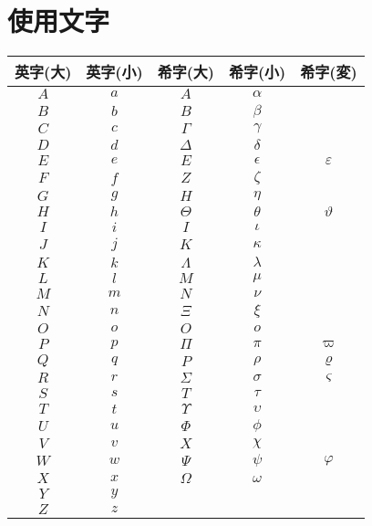 \section{使用文字}
	\begin{table}[htb]
		\begin{tabular}{|c|c|c|c|c|} \hline
			英字(大) & 英字(小) & 希字(大) & 希字(小) & 希字(変) \\ \hline \hline
			$A$ & $a$ & $A$ & $\alpha$ & \\ \hline
			$B$ & $b$ & $B$ & $\beta$ & \\ \hline
			$C$ & $c$ & $\Gamma$ & $\gamma$ & \\ \hline
			$D$ & $d$ & $\Delta$ & $\delta$ & \\ \hline
			$E$ & $e$ & $E$ & $\epsilon$ & $\varepsilon$ \\ \hline
			$F$ & $f$ & $Z$ & $\zeta$ & \\ \hline
			$G$ & $g$ & $H$ & $\eta$ & \\ \hline
			$H$ & $h$ & $\Theta$ & $\theta$ & $\vartheta$ \\ \hline
			$I$ & $i$ & $I$ & $\iota$ & \\ \hline
			$J$ & $j$ & $K$ & $\kappa$ & \\ \hline
			$K$ & $k$ & $\Lambda$ & $\lambda$ & \\ \hline
			$L$ & $l$ & $M$ & $\mu$ & \\ \hline
			$M$ & $m$ & $N$ & $\nu$ & \\ \hline
			$N$ & $n$ & $\Xi$ & $\xi$ & \\ \hline
			$O$ & $o$ & $O$ & $o$ & \\ \hline
			$P$ & $p$ & $\Pi$ & $\pi$ & $\varpi$ \\ \hline
			$Q$ & $q$ & $P$ & $\rho$ & $\varrho$ \\ \hline
			$R$ & $r$ & $\Sigma$ & $\sigma$ & $\varsigma$ \\ \hline
			$S$ & $s$ & $T$ & $\tau$ & \\ \hline
			$T$ & $t$ & $\Upsilon$ & $\upsilon$ & \\ \hline
			$U$ & $u$ & $\Phi$ & $\phi$ & \\ \hline
			$V$ & $v$ & $X$ & $\chi$ & \\ \hline
			$W$ & $w$ & $\Psi$ & $\psi$ & $\varphi$ \\ \hline
			$X$ & $x$ & $\Omega$ & $\omega$ & \\ \hline
			$Y$ & $y$ & & & \\ \hline
			$Z$ & $z$ & & & \\ \hline
		\end{tabular}
		\label{tab:alphabet}
	\end{table}